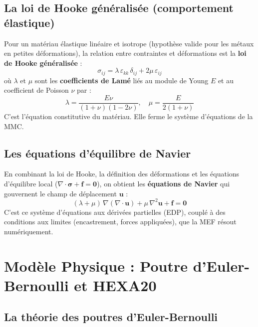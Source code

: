 \documentclass[journal, a4paper, twocolumn]{IEEEtran}
\begin{document}
\subsection{La loi de Hooke généralisée (comportement élastique)}

Pour un matériau élastique linéaire et isotrope (hypothèse valide pour les métaux en petites déformations), la relation entre contraintes et déformations est la \textbf{loi de Hooke généralisée} :
\begin{equation}
    \sigma_{ij} = \lambda \, \varepsilon_{kk} \, \delta_{ij} + 2\mu \, \varepsilon_{ij}
\end{equation}
où $\lambda$ et $\mu$ sont les \textbf{coefficients de Lamé} liés au module de Young $E$ et au coefficient de Poisson $\nu$ par :
\begin{equation}
    \lambda = \frac{E\nu}{(1+\nu)(1-2\nu)}, \quad \mu = \frac{E}{2(1+\nu)}
\end{equation}
C'est l'équation constitutive du matériau. Elle ferme le système d'équations de la MMC.

\subsection{Les équations d'équilibre de Navier}

En combinant la loi de Hooke, la définition des déformations et les équations d'équilibre local ($\nabla \cdot \bm{\sigma} + \bm{f} = \bm{0}$), on obtient les \textbf{équations de Navier} qui gouvernent le champ de déplacement $\bm{u}$ :
\begin{equation}
    (\lambda + \mu)\,\nabla(\nabla \cdot \bm{u}) + \mu\,\nabla^2 \bm{u} + \bm{f} = \bm{0}
\end{equation}
C'est ce système d'équations aux dérivées partielles (EDP), couplé à des conditions aux limites (encastrement, forces appliquées), que la MEF résout numériquement.

\section{Modèle Physique : Poutre d'Euler-Bernoulli et HEXA20}

\subsection{La théorie des poutres d'Euler-Bernoulli}
\end{document}
